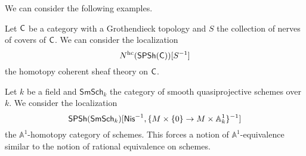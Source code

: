 We can consider the following examples. 
\begin{example}
    Let $\mathsf{C}$ be a category with a Grothendieck topology and $S$ the collection of nerves of covers of $\mathsf{C}$. We can consider the localization 
    $$N^{\mathrm{hc}}(\mathsf{SPSh}(\mathsf{C}))[S^{-1}]$$
    the homotopy coherent sheaf theory on $\mathsf{C}$. 
\end{example}
\begin{example}
    Let $k$ be a field and $\mathsf{SmSch}_{k}$ the category of smooth quasiprojective schemes over $k$. We consider the localization 
    $$\mathsf{SPSh}(\mathsf{SmSch}_{k})[\mathsf{Nis}^{-1}, \{M\times\{0\}\to M\times\mathbb{A}^{1}_{k}\}^{-1}]$$
    the $\mathbb{A}^{1}$-homotopy category of schemes. This forces a notion of $\mathbb{A}^{1}$-equivalence similar to the notion of rational equivalence on schemes. 
\end{example}